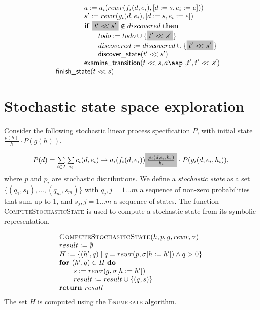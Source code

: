 \documentclass{article}
\newcommand{\at}[1]{\mbox{\aap ,} #1}
\newcommand{\aftertime}{\ensuremath{<\!\!<}}
\newcommand{\Space}{\text{\ }}
\newcommand{\If}{\text{\textbf{if }}}
\newcommand{\Do}{\text{\textbf{do }}}
\newcommand{\Then}{\text{\textbf{then }}}
\newcommand{\For}{\text{\textbf{for }}}
\newcommand{\Return}{\text{\textbf{return }}}
\begin{document}
\[\begin{tabular}{l}
\qquad \qquad \qquad $a := a_i(rewr(f_i(d,e_i), [d:=s,e_i:=e]))$ \\
\qquad \qquad \qquad $s' := rewr(g_i(d,e_i), [d:=s,e_i:=e])$ \\
\qquad \qquad \qquad $\If \colorbox{lightgray}{$t' \aftertime s'$} \notin discovered \Space \Then$ \\
\qquad \qquad \qquad \qquad $todo := todo \cup \{ \colorbox{lightgray}{$t' \aftertime s'$} \}$ \\
\qquad \qquad \qquad \qquad $discovered := discovered \cup \{ \colorbox{lightgray}{$t' \aftertime s'$} \}$ \\
\qquad \qquad \qquad \qquad $\textsf{discover\_state}( t' \aftertime s' )$ \\
\qquad \qquad \qquad $\textsf{examine\_transition}(t \aftertime s, a \at t', t' \aftertime s')$ \\
\qquad $\textsf{finish\_state}(t \aftertime s)$ \\
\end{tabular}
\]

\newpage
\section{Stochastic state space exploration}
Consider the following stochastic linear process specification $P$, with initial
state $\frac{p(h)}{h} \cdot P(g(h))$.

\begin{equation}
\begin{array}{l}
P(d)=
\sum\limits_{i\in I}\sum\limits_{e_i}c_i(d, e_i)\rightarrow a_i(f_i(d,e_i))
\colorbox{lightgray}{$\frac{p_i(d,e_i,h_i)}{h_i} $}
\cdot P(g_i(d,e_i,h_i)),
\end{array}
\end{equation}
where $p$ and $p_i$ are stochastic distributions.
We define a \emph{stochastic state} as a set
$\{(q_1, s_1), \ldots, (q_m, s_m)\}$ with $q_j, j = 1 \ldots m$ a sequence of non-zero probabilities that sum up to 1, and $s_j, j = 1 \ldots m$ a sequence of states.
The function \textsc{ComputeStochasticState} is used to compute a stochastic state from its symbolic representation.

\[
\begin{tabular}{l}
\textsc{ComputeStochasticState}($h, p, g, rewr, \sigma$) \\
$result := \emptyset$ \\
$H := \{ (h',q) \mid q = rewr(p, \sigma[h := h']) \wedge q > 0 \}$ \\
$\For (h', q) \in H$ \Do \\
\qquad $s := rewr(g, \sigma[h := h'])$ \\
\qquad $result := result \cup \{ (q, s) \}$ \\
\Return $result$
\end{tabular}
\]
The set $H$ is computed using the \textsc{Enumerate} algorithm. 
\end{document}
